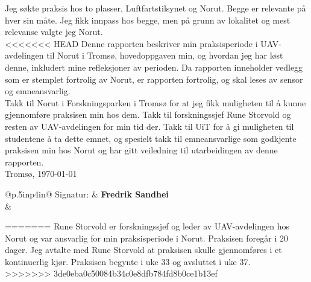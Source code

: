 \documentclass[12pt, a4paper]{article}
\begin{document}
Jeg søkte praksis hos to plasser, Luftfartstilsynet og Norut. Begge er relevante på hver sin måte. Jeg fikk innpass hos begge, men på grunn av lokalitet og mest relevanse valgte jeg Norut.\\

<<<<<<< HEAD
Denne rapporten beskriver min praksisperiode i UAV-avdelingen til Norut i Tromsø, hovedoppgaven min, og hvordan jeg har løst denne, inkludert mine refleksjoner av perioden. Da rapporten inneholder vedlegg som er stemplet fortrolig av Norut, er rapporten fortrolig, og skal leses av sensor og emneansvarlig. \\ 

Takk til Norut i Forskningsparken i Tromsø for at jeg fikk muligheten til å kunne gjennomføre praksisen min hos dem. Takk til forskningssjef Rune Storvold og resten av UAV-avdelingen for min tid der. Takk til UiT for å gi muligheten til studentene å ta dette emnet, og spesielt takk til emneansvarlige som godkjente praksisen min hos Norut og har gitt veiledning til utarbeidingen av denne rapporten. \\[7cm]
Tromsø, \today \\[.5cm]

\begin{flushleft}
	\begin{tabular}{@{}p{.5in}p{4in}@{}}
	Signatur: & \hspace{.5cm}\textbf{Fredrik Sandhei} \\
			  & \hrulefill \\
	\end{tabular}

\end{flushleft}
\clearpage
=======
Rune Storvold er forskningssjef og leder av UAV-avdelingen hos Norut og var ansvarlig for min praksisperiode i Norut. Praksisen foregår i 20 dager. Jeg avtalte med Rune Storvold at praksisen skulle gjennomføres i et kontinuerlig kjør. Praksisen begynte i uke 33 og avsluttet i uke 37.\\
>>>>>>> 3de0eba0c50084b34c0e8dfb784fd8b0ce1b13ef

\begin{minipage}[b]{1\linewidth}
	\tableofcontents
	\vspace{.5cm}
\end{minipage}
\begin{minipage}[b]{1\linewidth}
	\listoffigures
\end{minipage}
\clearpage
\end{document}
